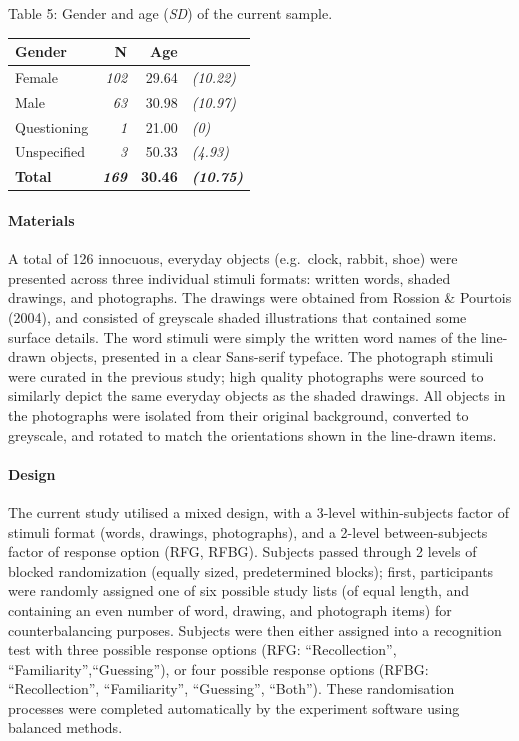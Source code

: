 \documentclass[
  11pt,
]{article}
\begin{document}
Table 5: Gender and age (\emph{SD}) of the current sample.

\begin{table}[!h]
\centering
\begin{tabular}{l>{}rr>{}l}
\toprule
Gender & N & Age &  \\
\midrule
Female & \em{102} & 29.64 & \em{(10.22)}\\
Male & \em{63} & 30.98 & \em{(10.97)}\\
Questioning & \em{1} & 21.00 & \em{(0)}\\
Unspecified & \em{3} & 50.33 & \em{(4.93)}\\
\textbf{Total} & \textbf{\em{169}} & \textbf{30.46} & \textbf{\em{(10.75)}}\\
\bottomrule
\end{tabular}
\end{table}

\hypertarget{materials-2}{%
\paragraph{Materials}\label{materials-2}}

A total of 126 innocuous, everyday objects (e.g.~clock, rabbit, shoe)
were presented across three individual stimuli formats: written words,
shaded drawings, and photographs. The drawings were obtained from
Rossion \& Pourtois (2004), and consisted of greyscale shaded
illustrations that contained some surface details. The word stimuli were
simply the written word names of the line-drawn objects, presented in a
clear Sans-serif typeface. The photograph stimuli were curated in the
previous study; high quality photographs were sourced to similarly
depict the same everyday objects as the shaded drawings. All objects in
the photographs were isolated from their original background, converted
to greyscale, and rotated to match the orientations shown in the
line-drawn items.

\hypertarget{design-2}{%
\paragraph{Design}\label{design-2}}

The current study utilised a mixed design, with a 3-level
within-subjects factor of stimuli format (words, drawings, photographs),
and a 2-level between-subjects factor of response option (RFG, RFBG).
Subjects passed through 2 levels of blocked randomization (equally
sized, predetermined blocks); first, participants were randomly assigned
one of six possible study lists (of equal length, and containing an even
number of word, drawing, and photograph items) for counterbalancing
purposes. Subjects were then either assigned into a recognition test
with three possible response options (RFG: ``Recollection'',
``Familiarity'',``Guessing''), or four possible response options (RFBG:
``Recollection'', ``Familiarity'', ``Guessing'', ``Both''). These
randomisation processes were completed automatically by the experiment
software using balanced methods.
\end{document}
